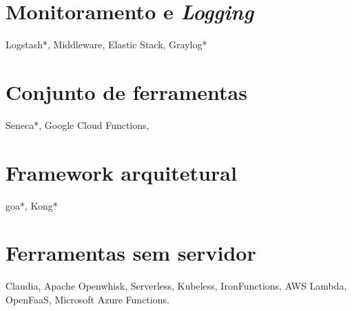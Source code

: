 


\section{Monitoramento e \emph{Logging}}
Logstash*, Middleware, Elastic Stack, Graylog*

\section{Conjunto de ferramentas}
Seneca*, Google Cloud Functions,

\section{Framework arquitetural}
goa*, Kong*

\section{Ferramentas sem servidor}
Claudia, Apache Openwhisk, Serverless, Kubeless, IronFunctions, AWS Lambda, OpenFaaS, Microsoft Azure Functions.

